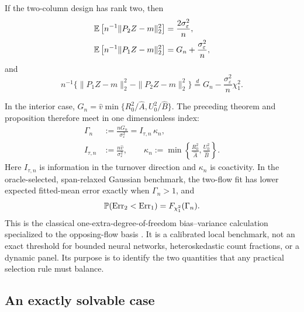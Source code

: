 \begin{proposition}
\label{prop:benchmark}
If the two-column design has rank two, then
\begin{align}
\mathbb{E}\left[n^{-1}\|P_2Z-m\|_2^2\right]&=\frac{2\sigma_\varepsilon^2}{n},\nonumber\\
\mathbb{E}\left[n^{-1}\|P_1Z-m\|_2^2\right]&=G_n+\frac{\sigma_\varepsilon^2}{n},
\label{eq:benchmark_risks}
\end{align}
and
\begin{equation}
n^{-1}\{\|P_1Z-m\|_2^2-\|P_2Z-m\|_2^2\}
\overset{d}{=}G_n-\frac{\sigma_\varepsilon^2}{n}\chi_1^2.
\label{eq:benchmark_distribution}
\end{equation}
\end{proposition}

In the interior case, $G_n=\widehat v\min\{R_0^2/\widehat A,U_0^2/\widehat B\}$. The preceding theorem and proposition therefore meet in one dimensionless index:
\begin{equation}
\boxed{\begin{aligned}
\Gamma_n&:=\frac{nG_n}{\sigma_\varepsilon^2}=I_{\tau,n}\,\kappa_n,\\
I_{\tau,n}&:=\frac{n\widehat v}{\sigma_\varepsilon^2},\qquad
\kappa_n:=\min\left\{\frac{R_0^2}{\widehat A},\frac{U_0^2}{\widehat B}\right\}.
\end{aligned}}
\label{eq:gamma}
\end{equation}
Here $I_{\tau,n}$ is information in the turnover direction and $\kappa_n$ is coactivity. In the oracle-selected, span-relaxed Gaussian benchmark, the two-flow fit has lower expected fitted-mean error exactly when $\Gamma_n>1$, and
\begin{equation}
\mathbb{P}(\operatorname{Err}_2<\operatorname{Err}_1)=F_{\chi_1^2}(\Gamma_n).
\label{eq:win_probability}
\end{equation}
This is the classical one-extra-degree-of-freedom bias--variance calculation specialized to the opposing-flow basis \citep{mallows1973}. It is a calibrated local benchmark, not an exact threshold for bounded neural networks, heteroskedastic count fractions, or a dynamic panel. Its purpose is to identify the two quantities that any practical selection rule must balance.

\subsection{An exactly solvable case}
\label{sec:toy}

